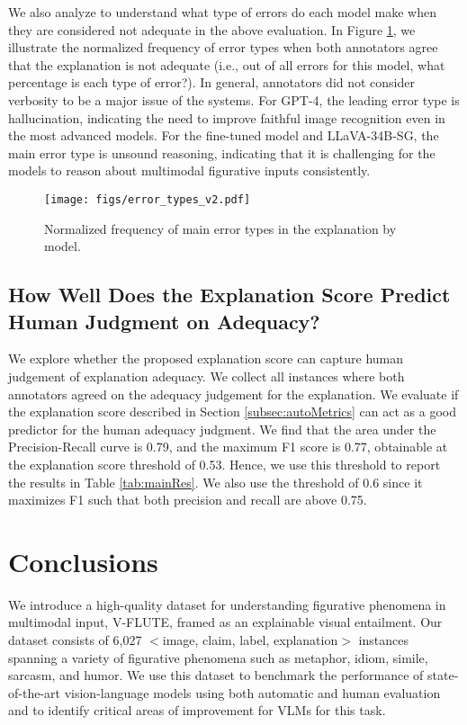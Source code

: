 We also analyze to understand what type of errors do each model make when they are considered not adequate in the above evaluation. In Figure \ref{fig:errorTypesAnnot}, we illustrate the normalized frequency of error types when both annotators agree that the explanation is not adequate (i.e., out of all errors for this model, what percentage is each type of error?). In general, annotators did not consider verbosity to be a major issue of the systems. For GPT-4, the leading error type is hallucination, indicating the need to improve faithful image recognition even in the most advanced models.
For the fine-tuned model and LLaVA-34B-SG, the main error type is unsound reasoning, indicating that it is challenging for the models to reason about multimodal figurative inputs consistently.
\begin{figure}
    \centering
    \texttt{[image: figs/error\_types\_v2.pdf]}
    \caption{Normalized frequency of main error types in the explanation by model.}
    \label{fig:errorTypesAnnot}
\end{figure}

\subsection{How Well Does the Explanation Score Predict Human Judgment on Adequacy?} \label{subsec:explScoreCorr}

We explore whether the proposed explanation score can capture human judgement of explanation adequacy. We collect all instances where both annotators agreed on the adequacy judgement for the explanation.
We evaluate if the explanation score described in Section \ref{subsec:autoMetrics} can act as a good predictor for the human adequacy judgment. We find that the area under the Precision-Recall curve is 0.79, and the maximum F1 score is 0.77, obtainable at the explanation score threshold of 0.53. Hence, we use this threshold to report the results in Table \ref{tab:mainRes}. We also use the threshold of 0.6 since it maximizes F1 such that both precision and recall are above 0.75. 


\section{Conclusions}
We introduce a high-quality dataset for understanding figurative phenomena in multimodal input, V-FLUTE, framed as an explainable visual entailment.
Our dataset consists of 6,027 $<$image, claim, label, explanation$>$ instances spanning a variety of figurative phenomena such as metaphor, idiom, simile, sarcasm, and humor. We use this dataset to benchmark the performance of state-of-the-art vision-language models  using both automatic and human evaluation and to identify critical areas of improvement for VLMs for this task.

